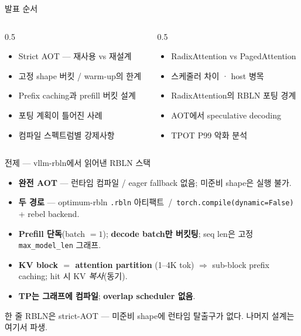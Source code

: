 \begin{frame}{발표 순서}
  \small
  \begin{columns}[T]
    \begin{column}{0.5\textwidth}
      \begin{itemize}\setlength\itemsep{4pt}
        \item[Q1] Strict AOT — 재사용 vs 재설계
        \item[Q2] 고정 shape 버킷 / warm-up의 한계
        \item[Q3] Prefix caching과 prefill 버킷 설계
        \item[Q4] 포팅 계획이 틀어진 사례
        \item[Q5] 컴파일 스펙트럼별 강제사항
      \end{itemize}
    \end{column}
    \begin{column}{0.5\textwidth}
      \begin{itemize}\setlength\itemsep{4pt}
        \item[Q6] RadixAttention vs PagedAttention
        \item[Q7] 스케줄러 차이 · host 병목
        \item[Q8] RadixAttention의 RBLN 포팅 경계
        \item[Q9] AOT에서 speculative decoding
        \item[Q10] TPOT P99 악화 분석
      \end{itemize}
    \end{column}
  \end{columns}
\end{frame}

\begin{frame}{전제 — vllm-rbln에서 읽어낸 RBLN 스택}
  \begin{itemize}\setlength\itemsep{5pt}
    \item \textbf{완전 AOT} — 런타임 컴파일 / eager fallback 없음; 미준비 shape은 실행 불가.
    \item \textbf{두 경로} — optimum-rbln \texttt{.rbln} 아티팩트 \,/\, \texttt{torch.compile(dynamic=False)} + rebel backend.
    \item \textbf{Prefill 단독}(batch $=1$); \textbf{decode batch만 버킷팅}; seq len은 고정 \texttt{max\_model\_len} 그래프.
    \item \textbf{KV block $=$ attention partition} (1--4K tok) $\Rightarrow$ sub-block prefix caching; hit 시 KV \emph{복사}(동기).
    \item \textbf{TP는 그래프에 컴파일}; \textbf{overlap scheduler 없음}.
  \end{itemize}
  \begin{alertblock}{한 줄}
    RBLN은 strict-AOT — 미준비 shape에 런타임 탈출구가 없다. 나머지 설계는 여기서 파생.
  \end{alertblock}
\end{frame}
